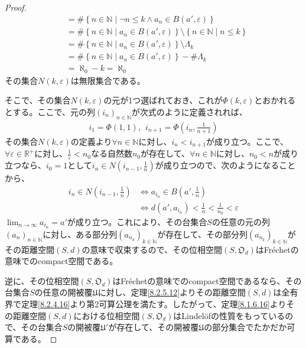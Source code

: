 \documentclass[dvipdfmx]{jsarticle}
\begin{document}
\begin{proof}
\begin{align*}
&= {\#}\left\{ n \in \mathbb{N} \middle| \neg n \leq k \land a_{n} \in B\left( a',\varepsilon \right) \right\}\\
&= {\#}{\left\{ n \in \mathbb{N} \middle| a_{n} \in B\left( a',\varepsilon \right) \right\} \setminus \left\{ n \in \mathbb{N} \middle| n \leq k \right\}}\\
&= {\#}{\left\{ n \in \mathbb{N} \middle| a_{n} \in B\left( a',\varepsilon \right) \right\} \setminus \varLambda_{k}}\\
&= {\#}\left\{ n \in \mathbb{N} \middle| a_{n} \in B\left( a',\varepsilon \right) \right\} - {\#}\varLambda_{k}\\
&= \aleph_{0} - k = \aleph_{0}
\end{align*}
その集合$N(k,\varepsilon)$は無限集合である。\par
そこで、その集合$N(k,\varepsilon)$の元が1つ選ばれておき、これが$\varPhi(k,\varepsilon)$とおかれるとする。ここで、元の列$\left( i_{n} \right)_{n \in \mathbb{N}}$が次式のように定義されれば、
\begin{align*}
i_{1} = \varPhi(1,1),\ \ i_{n + 1} = \varPhi\left( i_{n},\frac{1}{n + 1} \right)
\end{align*}
その集合$N(k,\varepsilon)$の定義より$\forall n \in \mathbb{N}$に対し、$i_{n} < i_{n + 1}$が成り立つ。ここで、$\forall\varepsilon \in \mathbb{R}^{+}$に対し、$\frac{1}{\varepsilon} < n_{0}$なる自然数$n_{0}$が存在して、$\forall n \in \mathbb{N}$に対し、$n_{0} < n$が成り立つなら、$i_{0} = 1$として$i_{n} \in N\left( i_{n - 1},\frac{1}{n} \right)$が成り立つので、次のようになることから、
\begin{align*}
i_{n} \in N\left( i_{n - 1},\frac{1}{n} \right) &\Leftrightarrow a_{i_{n}} \in B\left( a',\frac{1}{n} \right)\\
&\Leftrightarrow d\left( a',a_{i_{n}} \right) < \frac{1}{n} < \frac{1}{n_{0}} < \varepsilon
\end{align*}
$\lim_{n \rightarrow \infty}a_{i_{n}} = a'$が成り立つ。これにより、その台集合$S$の任意の元の列$\left( a_{n} \right)_{n \in \mathbb{N}}$に対し、ある部分列$\left( a_{n_{k}} \right)_{k \in \mathbb{N}}$が存在して、その部分列$\left( a_{n_{k}} \right)_{k \in \mathbb{N}}$がその距離空間$(S,d)$の意味で収束するので、その位相空間$\left( S,\mathfrak{O}_{d} \right)$はFréchetの意味でのcompact空間である。\par
逆に、その位相空間$\left( S,\mathfrak{O}_{d} \right)$はFréchetの意味でのcompact空間であるなら、その台集合$S$の任意の開被覆$\mathfrak{U}$に対し、定理\ref{8.2.5.12}よりその距離空間$(S,d)$は全有界で定理\ref{8.2.4.16}より第2可算公理を満たす。したがって、定理\ref{8.1.6.16}よりその距離空間$(S,d)$における位相空間$\left( S,\mathfrak{O}_{d} \right)$はLindelöfの性質をもっているので、その台集合$S$の開被覆$\mathfrak{U}'$が存在して、その開被覆$\mathfrak{U}$の部分集合でたかだか可算である。\par

\end{proof}
\end{document}
